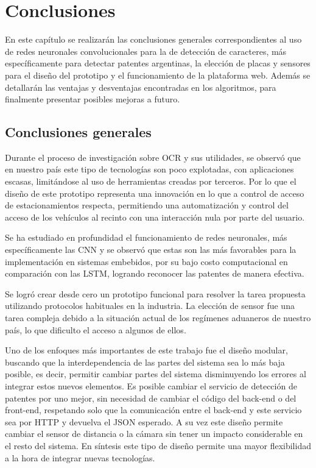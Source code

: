 \chapter{Conclusiones}
En este capítulo se realizarán las conclusiones generales correspondientes al uso de redes neuronales convolucionales para la de detección de caracteres, más específicamente para detectar patentes argentinas, la elección de placas y sensores para el diseño del prototipo y el funcionamiento de la plataforma web. Además se detallarán las ventajas y desventajas encontradas en los algoritmos, para finalmente presentar posibles mejoras a futuro.

\section{Conclusiones generales}

Durante el proceso de investigación sobre OCR y sus utilidades, se observó que en nuestro país este tipo de tecnologías son poco explotadas, con aplicaciones escasas, limitándose al uso de herramientas creadas por terceros.
Por lo que el diseño de este prototipo representa una innovación en lo que a control de acceso de estacionamientos respecta, permitiendo una automatización y control del acceso de los vehículos al recinto con una interacción nula por parte del usuario.

Se ha estudiado en profundidad el funcionamiento de redes neuronales, más específicamente las CNN y se observó que estas son las más favorables para la implementación en sistemas embebidos, por su bajo costo computacional en comparación con las LSTM, logrando reconocer las patentes de manera efectiva.

Se logró crear desde cero un prototipo funcional para resolver la tarea propuesta utilizando protocolos habituales en la industria.
La elección de sensor fue una tarea compleja debido a la situación actual de los regímenes aduaneros de nuestro país, lo que dificulto el acceso a algunos de ellos.

Uno de los enfoques más importantes de este trabajo fue el diseño modular, buscando que la interdependencia de las partes del sistema sea lo más baja posible, es decir, permitir cambiar partes del sistema disminuyendo los errores al integrar estos nuevos elementos.
Es posible cambiar el servicio de detección de patentes por uno mejor, sin necesidad de cambiar el código del back-end o del front-end, respetando solo que la comunicación entre el back-end y este servicio sea por HTTP y devuelva el JSON esperado.
A su vez este diseño permite cambiar el sensor de distancia o la cámara sin tener un impacto considerable en el resto del sistema.
En síntesis este tipo de diseño permite una mayor flexibilidad a la hora de integrar nuevas tecnologías.


